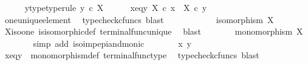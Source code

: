 \begin{isabellebody}
\ \ \ \ \isamarkupfalse%
\ y{\isacharunderscore}{\kern0pt}type{\isacharbrackleft}{\kern0pt}type{\isacharunderscore}{\kern0pt}rule{\isacharbrackright}{\kern0pt}{\isacharcolon}{\kern0pt}\ {\isachardoublequoteopen}y\ {\isasymin}\isactrlsub c\ X{\isachardoublequoteclose}\isanewline
\ \ \ \ \isamarkupfalse%
\ {\isasymbeta}x{\isacharunderscore}{\kern0pt}eq{\isacharunderscore}{\kern0pt}{\isasymbeta}y{\isacharcolon}{\kern0pt}\ {\isachardoublequoteopen}{\isasymbeta}\isactrlbsub X\isactrlesub \ {\isasymcirc}\isactrlsub c\ x\ {\isacharequal}{\kern0pt}\ {\isasymbeta}\isactrlbsub X\isactrlesub \ {\isasymcirc}\isactrlsub c\ y{\isachardoublequoteclose}\isanewline
\ \ \ \ \ \ \isamarkupfalse%
\ one{\isacharunderscore}{\kern0pt}unique{\isacharunderscore}{\kern0pt}element\ \isamarkupfalse%
\ {\isacharparenleft}{\kern0pt}typecheck{\isacharunderscore}{\kern0pt}cfuncs{\isacharcomma}{\kern0pt}\ blast{\isacharparenright}{\kern0pt}\ \ \ \ \ \ \isanewline
\ \ \ \ \isamarkupfalse%
\ {\isachardoublequoteopen}isomorphism\ {\isacharparenleft}{\kern0pt}{\isasymbeta}\isactrlbsub X\isactrlesub {\isacharparenright}{\kern0pt}{\isachardoublequoteclose}\isanewline
\ \ \ \ \ \ \isamarkupfalse%
\ X{\isacharunderscore}{\kern0pt}iso{\isacharunderscore}{\kern0pt}one\ is{\isacharunderscore}{\kern0pt}isomorphic{\isacharunderscore}{\kern0pt}def\ terminal{\isacharunderscore}{\kern0pt}func{\isacharunderscore}{\kern0pt}unique\ \isamarkupfalse%
\ blast\isanewline
\ \ \ \ \isamarkupfalse%
\ \isamarkupfalse%
\ {\isachardoublequoteopen}monomorphism\ {\isacharparenleft}{\kern0pt}{\isasymbeta}\isactrlbsub X\isactrlesub {\isacharparenright}{\kern0pt}{\isachardoublequoteclose}\isanewline
\ \ \ \ \ \ \isamarkupfalse%
\ {\isacharparenleft}{\kern0pt}simp\ add{\isacharcolon}{\kern0pt}\ iso{\isacharunderscore}{\kern0pt}imp{\isacharunderscore}{\kern0pt}epi{\isacharunderscore}{\kern0pt}and{\isacharunderscore}{\kern0pt}monic{\isacharparenright}{\kern0pt}\isanewline
\ \ \ \ \isamarkupfalse%
\ \isamarkupfalse%
\ {\isachardoublequoteopen}x{\isacharequal}{\kern0pt}\ y{\isachardoublequoteclose}\isanewline
\ \ \ \ \ \ \isamarkupfalse%
\ {\isasymbeta}x{\isacharunderscore}{\kern0pt}eq{\isacharunderscore}{\kern0pt}{\isasymbeta}y\ \ monomorphism{\isacharunderscore}{\kern0pt}def{}\ terminal{\isacharunderscore}{\kern0pt}func{\isacharunderscore}{\kern0pt}type\ \isamarkupfalse%
\ {\isacharparenleft}{\kern0pt}typecheck{\isacharunderscore}{\kern0pt}cfuncs{\isacharcomma}{\kern0pt}\ blast{\isacharparenright}{\kern0pt}\ \ \ \ \ \ \isanewline

\end{isabellebody}
